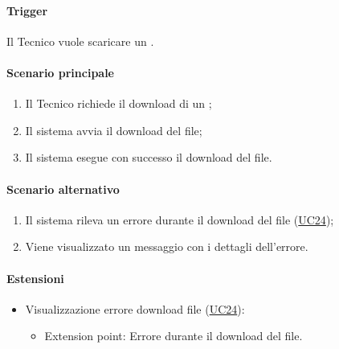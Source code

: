 \paragraph*{Trigger}
Il Tecnico vuole scaricare un .

\paragraph*{Scenario principale}
\begin{enumerate}
  \item Il Tecnico richiede il download di un ;
  \item Il sistema avvia il download del file;
  \item Il sistema esegue con successo il download del file.
\end{enumerate}

\paragraph*{Scenario alternativo}
\begin{enumerate}
  \item Il sistema rileva un errore durante il download del file (\hyperref[UC24]{UC24});
  \item Viene visualizzato un messaggio con i dettagli dell'errore.
\end{enumerate}

\paragraph*{Estensioni}
\begin{itemize}
  \item Visualizzazione errore download file (\hyperref[UC24]{UC24}):
  \begin{itemize}
    \item Extension point: Errore durante il download del file.
  \end{itemize}
\end{itemize}